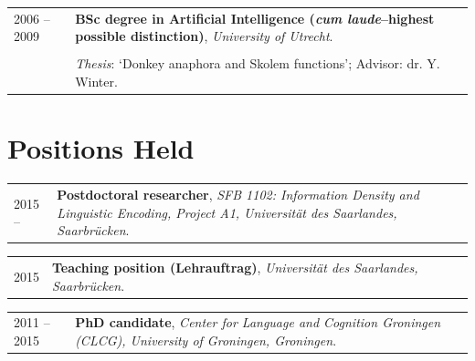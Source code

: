 \documentclass[a4paper,10pt]{article}
\def\leftcolwidth{.12\textwidth}
\def\tablevspace{10pt}
\begin{document}
\vspace{\tablevspace}

\noindent
\begin{tabularx}{\textwidth}{ p{\leftcolwidth} X }
  2006 -- 2009  
  & \textbf{BSc degree in Artificial Intelligence 
    (\textit{cum laude}--highest possible distinction)}, 
    \textit{University of Utrecht}.\\
  & \\
  & \textit{Thesis}: `Donkey anaphora and Skolem functions'; Advisor: dr. Y. Winter.
\end{tabularx}


\section*{Positions Held}

\noindent
\begin{tabularx}{\textwidth}{ p{\leftcolwidth} X }
  2015 --
  & \textbf{Postdoctoral researcher}, \textit{SFB 1102: Information Density and
      Linguistic Encoding, Project A1, Universit\"at des Saarlandes,
      Saarbr\"ucken}.\\
    \end{tabularx}

\vspace{\tablevspace}

\noindent
\begin{tabularx}{\textwidth}{ p{\leftcolwidth} X }
  2015
  & \textbf{Teaching position (Lehrauftrag)}, \textit{Universit\"at des
      Saarlandes, Saarbr\"ucken}.\\
\end{tabularx}

\vspace{\tablevspace}

\noindent
\begin{tabularx}{\textwidth}{ p{\leftcolwidth} X }
  2011 -- 2015
  & \textbf{PhD candidate}, \textit{Center for Language and Cognition
      Groningen (CLCG), University of Groningen, Groningen}.\\
\end{tabularx}

\vspace{\tablevspace}
\end{document}
